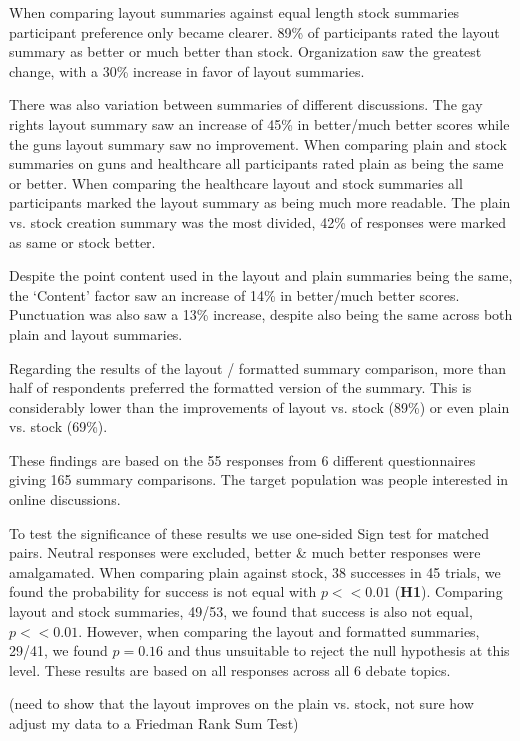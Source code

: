       When comparing layout summaries against equal length stock summaries participant preference only became clearer. 89\% of participants rated the layout summary as better or much better than stock. Organization saw the greatest change, with a 30\% increase in favor of layout summaries.

      There was also variation between summaries of different discussions. The gay rights layout summary saw an increase of 45\% in better/much better scores while the guns layout summary saw no improvement. When comparing plain and stock summaries on guns and healthcare all participants rated plain as being the same or better. When comparing the healthcare layout and stock summaries all participants marked the layout summary as being much more readable. The plain vs. stock creation summary was the most divided, 42\% of responses were marked as same or stock better.

      Despite the point content used in the layout and plain summaries being the same, the `Content' factor saw an increase of 14\% in better/much better scores. Punctuation was also saw a 13\% increase, despite also being the same across both plain and layout summaries.

      Regarding the results of the layout / formatted summary comparison, more than half of respondents preferred the formatted version of the summary. This is considerably lower than the improvements of layout vs. stock (89\%) or even plain vs. stock (69\%).

      These findings are based on the 55 responses from 6 different questionnaires giving 165 summary comparisons. The target population was people interested in online discussions.

      To test the significance of these results we use one-sided Sign test for matched pairs. Neutral responses were excluded, better \& much better responses were amalgamated. When comparing plain against stock, 38 successes in 45 trials, we found the probability for success is not equal with $p << 0.01$ (\textbf{H1}). Comparing layout and stock summaries, 49/53, we found that success is also not equal, $p << 0.01$. However, when comparing the layout and formatted summaries, 29/41, we found $p = 0.16$ and thus unsuitable to reject the null hypothesis at this level. These results are based on all responses across all 6 debate topics.

      (need to show that the layout improves on the plain vs. stock, not sure how adjust my data to a Friedman Rank Sum Test)

